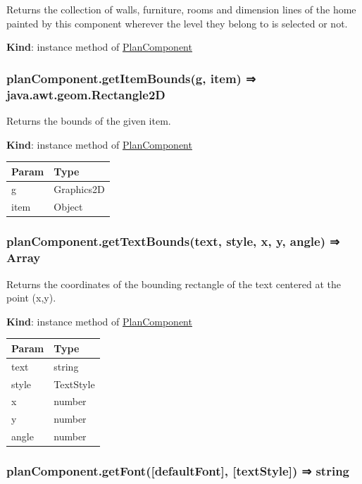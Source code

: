\documentclass[a4paper]{report}
\begin{document}
Returns the collection of walls, furniture, rooms and dimension lines of
the home painted by this component wherever the level they belong to is
selected or not.

\textbf{Kind}: instance method of
\protect\hyperlink{PlanComponent}{PlanComponent}\\

\hypertarget{plancomponent.getitemboundsg-item-java.awt.geom.rectangle2d}{%
\subsubsection{planComponent.getItemBounds(g, item) ⇒
java.awt.geom.Rectangle2D}\label{plancomponent.getitemboundsg-item-java.awt.geom.rectangle2d}}

Returns the bounds of the given item.

\textbf{Kind}: instance method of
\protect\hyperlink{PlanComponent}{PlanComponent}

\begin{longtable}[]{@{}ll@{}}
\toprule
Param & Type\tabularnewline
\midrule
\endhead
g & Graphics2D\tabularnewline
item & Object\tabularnewline
\bottomrule
\end{longtable}

\hypertarget{plancomponent.gettextboundstext-style-x-y-angle-array}{%
\subsubsection{planComponent.getTextBounds(text, style, x, y, angle) ⇒
Array}\label{plancomponent.gettextboundstext-style-x-y-angle-array}}

Returns the coordinates of the bounding rectangle of the text centered
at the point (x,y).

\textbf{Kind}: instance method of
\protect\hyperlink{PlanComponent}{PlanComponent}

\begin{longtable}[]{@{}ll@{}}
\toprule
Param & Type\tabularnewline
\midrule
\endhead
text & string\tabularnewline
style & TextStyle\tabularnewline
x & number\tabularnewline
y & number\tabularnewline
angle & number\tabularnewline
\bottomrule
\end{longtable}

\hypertarget{plancomponent.getfontdefaultfont-textstyle-string}{%
\subsubsection{planComponent.getFont({[}defaultFont{]}, {[}textStyle{]})
⇒ string}\label{plancomponent.getfontdefaultfont-textstyle-string}}
\end{document}
